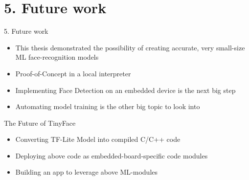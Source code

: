 \documentclass{beamer}
\begin{document}
\section{5. Future work}
\begin{frame}{5. Future work}
\begin{itemize}
    \item This thesis demonstrated the possibility of creating accurate, very small-size ML face-recognition models
    \item Proof-of-Concept in a local interpreter
    \item Implementing Face Detection on an embedded device is the next big step
    \item Automating model training is the other big topic to look into
\end{itemize}
\end{frame}

\begin{frame}{The Future of TinyFace}
    \begin{itemize}
        \item Converting TF-Lite Model into compiled C/C++ code
        \item Deploying above code as embedded-board-specific code modules
        \item Building an app to leverage above ML-modules
    \end{itemize}
\end{frame}
\end{document}
